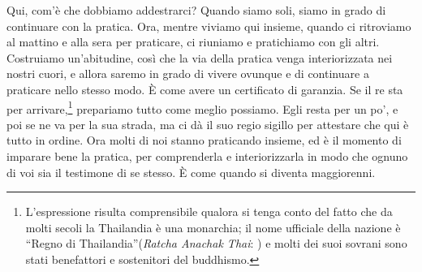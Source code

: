 Qui, com'è che dobbiamo addestrarci? Quando siamo soli, siamo in grado
di continuare con la pratica. Ora, mentre viviamo qui insieme, quando ci
ritroviamo al mattino e alla sera per praticare, ci riuniamo e
pratichiamo con gli altri. Costruiamo un'abitudine, così che la via
della pratica venga interiorizzata nei nostri cuori, e allora saremo in
grado di vivere ovunque e di continuare a praticare nello stesso modo. È
come avere un certificato di garanzia. Se il re sta per
arrivare,\footnote{L'espressione risulta comprensibile qualora si tenga
  conto del fatto che da molti secoli la Thailandia è una monarchia; il
  nome ufficiale della nazione è ``Regno di Thailandia''(\emph{Ratcha
  Anachak Thai}: ) e molti dei suoi sovrani sono stati
  benefattori e sostenitori del buddhismo.} prepariamo tutto come meglio
possiamo. Egli resta per un po', e poi se ne va per la sua strada, ma ci
dà il suo regio sigillo per attestare che qui è tutto in ordine. Ora
molti di noi stanno praticando insieme, ed è il momento di imparare bene
la pratica, per comprenderla e interiorizzarla in modo che ognuno di voi
sia il testimone di se stesso. È come quando si diventa maggiorenni.


